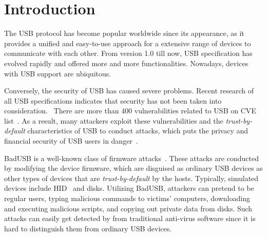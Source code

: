 \section{Introduction}
\label{sec:introduction}

The \ac{USB} protocol has become popular worldwide
since its appearance, as it provides a unified and easy-to-use approach for a
extensive range of devices to communicate with each other.  From version 1.0 till
now, \ac{USB} specification has evolved rapidly and offered more and more
functionalities.  Nowadays, devices with \ac{USB} support are ubiquitous.

Conversely, the security of \ac{USB} has caused severe problems.
Recent research of all USB specifications indicates that security has not been taken into consideration.~\cite{sok}  There are more than 400
vulnerabilities related to \ac{USB} on CVE list~\cite{website:CVE-list}.  As a
result, many attackers exploit these vulnerabilities and the
\textit{trust-by-default} characteristics of \ac{USB} to conduct attacks, which puts
the privacy and financial security of \ac{USB} users in danger~\cite{sok}.

BadUSB is a well-known class of firmware attacks~\cite{badusb}.  These attacks
are conducted by modifying the device firmware, which are disguised
 as ordinary \ac{USB} devices as other types of devices that are \textit{trust-by-default}
by the hosts.  Typically, simulated devices include \ac{HID}~\cite{hid} and disks.  Utilizing BadUSB,
attackers can pretend to be regular users, typing malicious commands to
victims' computers, downloading and executing malicious scripts, and copying out
private data from disks.  Such attacks can easily  get detected by from traditional
anti-virus software since it is hard to distinguish them from ordinary \ac{USB}
devices.


